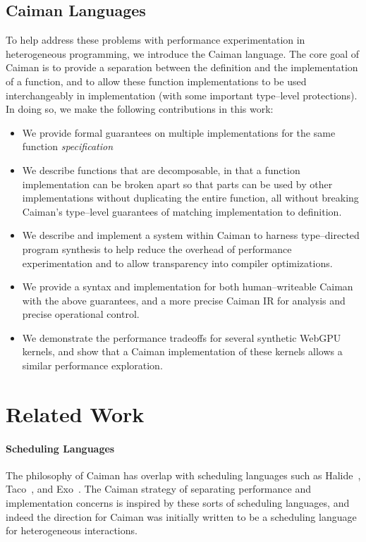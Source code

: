 \subsection{Caiman Languages}

To help address these problems with performance experimentation in heterogeneous programming, we introduce the Caiman language.  The core goal of Caiman is to provide a separation between the definition and the implementation of a function, and to allow these function implementations to be used interchangeably in implementation (with some important type--level protections).  In doing so, we make the following contributions in this work:
\begin{itemize}
\item We provide formal guarantees on multiple implementations for the same function \emph{specification}
\item We describe functions that are decomposable, in that a function implementation can be broken apart so that parts can be used by other implementations without duplicating the entire function, all without breaking Caiman's type--level guarantees of matching implementation to definition.
\item We describe and implement a system within Caiman to harness type--directed program synthesis to help reduce the overhead of performance experimentation and to allow transparency into compiler optimizations.
\item We provide a syntax and implementation for both human--writeable Caiman with the above guarantees, and a more precise Caiman IR for analysis and precise operational control.
\item We demonstrate the performance tradeoffs for several synthetic WebGPU kernels, and show that a Caiman implementation of these kernels allows a similar performance exploration.
\end{itemize}

\section{Related Work}

\paragraph{Scheduling Languages}

The philosophy of Caiman has overlap with scheduling languages such as Halide~\cite{halide}, Taco~\cite{taco}, and Exo~\cite{exo}.  The Caiman strategy of separating performance and implementation concerns is inspired by these sorts of scheduling languages, and indeed the direction for Caiman was initially written to be a scheduling language for heterogeneous interactions.  

